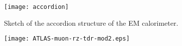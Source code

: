 



%




\begin{figure}[t!]
\centering
\texttt{[image: accordion]}
\caption{Sketch of the accordion structure of the EM calorimeter.}
\label{fig:}
\end{figure} 



\begin{figure}[t!]
\centering
\texttt{[image: ATLAS-muon-rz-tdr-mod2.eps]}
\caption{}
\label{fig:}
\end{figure} 

